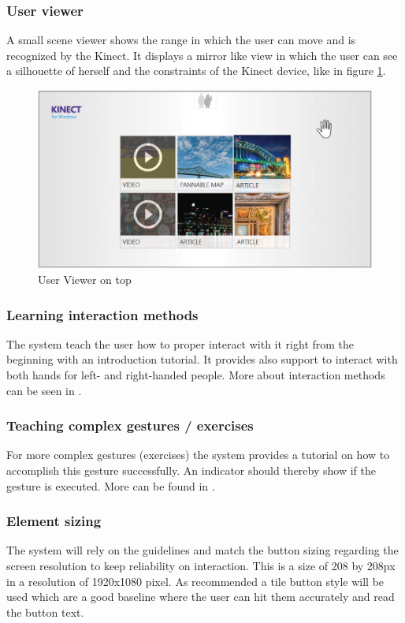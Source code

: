 \subsubsection{User viewer}
A small scene viewer shows the range in which the user can move and is recognized by the Kinect. It displays a mirror like view in which the user can see a silhouette of herself and the constraints of the Kinect device, like in figure \ref{fig:higUserViewer}.
\begin{figure}[htb]
	\centering
	\begin{minipage}[t]{1\linewidth}
		\centering
		\includegraphics[width=0.79\linewidth]{Pictures/higUserViewer}
		\caption{User Viewer on top~\cite{MicrosoftHIG2014-mh}}
		\label{fig:higUserViewer}
	\end{minipage}
\end{figure}

\subsubsection{Learning interaction methods}
The system teach the user how to proper interact with it right from the beginning with an introduction tutorial. It provides also support to interact with both hands for left- and right-handed people. More about interaction methods can be seen in \textbf{}.

\subsubsection{Teaching complex gestures / exercises}
For more complex gestures (exercises) the system provides a tutorial on how to accomplish this gesture successfully. An indicator should thereby show if the gesture is executed. More can be found in \textbf{}.

\subsubsection{Element sizing}
The system will rely on the guidelines and match the button sizing regarding the screen resolution to keep reliability on interaction. This is a size of 208 by 208px in a resolution of 1920x1080 pixel. As recommended a tile button style will be used which are a good baseline where the user can hit them accurately and read the button text.

